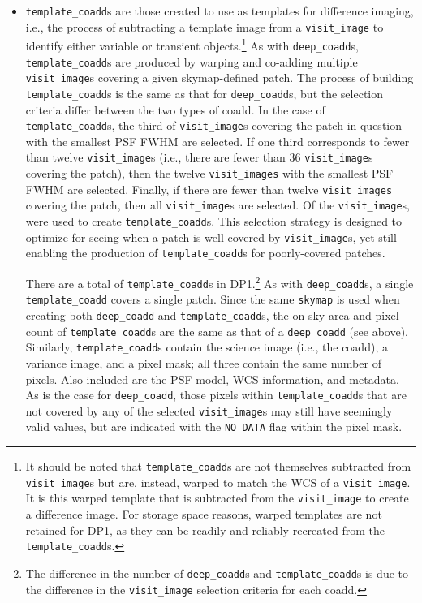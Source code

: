 \begin{itemize}
\item \texttt{template\_coadd}s \citep{10.71929/rubin/2570314} are those created to use as templates for difference imaging, i.e., the process of subtracting a template image from a \texttt{visit\_image} to identify either variable or \gls{transient} objects.\footnote{It should be noted that \texttt{template\_coadd}s are not themselves subtracted from \texttt{visit\_image}s but are, instead, warped to match the \gls{WCS} of a \texttt{visit\_image}.
It is this warped template that is subtracted from the \texttt{visit\_image} to create a difference image.
For storage space reasons, warped templates are not retained for \gls{DP1}, as they can be readily and reliably recreated from the \texttt{template\_coadd}s.}
As with \texttt{deep\_coadd}s, \texttt{template\_coadd}s are produced by warping and co-adding multiple \texttt{visit\_image}s covering a given skymap-defined \gls{patch}.
The process of building \texttt{template\_coadd}s is the same as that for \texttt{deep\_coadd}s, but the selection criteria differ between the two types of coadd.
In the case of \texttt{template\_coadd}s, the third of \texttt{visit\_image}s covering the \gls{patch} in question with the smallest \gls{PSF} \gls{FWHM} are selected.
If one third corresponds to fewer than twelve \texttt{visit\_image}s (i.e., there are fewer than 36 \texttt{visit\_image}s covering the \gls{patch}), then the twelve \texttt{visit\_images} with the smallest \gls{PSF} \gls{FWHM} are selected.
Finally, if there are fewer than twelve \texttt{visit\_images} covering the \gls{patch}, then all \texttt{visit\_image}s are selected. Of the \nvisitimages \texttt{visit\_image}s, \ntemplatevisitimages were used to create \texttt{template\_coadd}s.
This selection strategy is designed to optimize for \gls{seeing} when a \gls{patch} is well-covered by \texttt{visit\_image}s, yet still enabling the production of \texttt{template\_coadd}s for poorly-covered patches.

There are a total of \ntemplatecoadds \texttt{template\_coadd}s in \gls{DP1}.\footnote{The difference in the number of \texttt{deep\_coadd}s and \texttt{template\_coadd}s is due to the difference in the \texttt{visit\_image} selection criteria for each coadd.}
As with \texttt{deep\_coadd}s, a single \texttt{template\_coadd} covers a single \gls{patch}.
Since the same \texttt{skymap} is used when creating both \texttt{deep\_coadd} and \texttt{template\_coadd}s, the on-sky area and pixel count of \texttt{template\_coadd}s are the same as that of a \texttt{deep\_coadd} (see above).
Similarly, \texttt{template\_coadd}s contain the science image (i.e., the coadd), a variance image, and a pixel mask; all three contain the same number of pixels.
Also included are the \gls{PSF} model, \gls{WCS} information, and \gls{metadata}.
As is the case for \texttt{deep\_coadd}, those pixels within \texttt{template\_coadd}s that are not covered by any of the selected \texttt{visit\_image}s may still have seemingly valid values, but are indicated with the \texttt{NO\_DATA} flag within the pixel mask.


\end{itemize}
